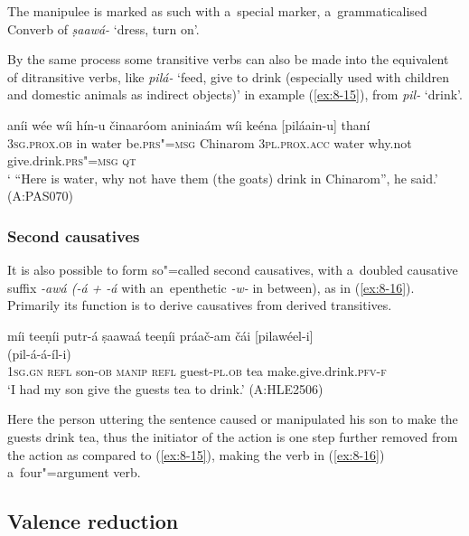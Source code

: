 The manipulee is marked as such with a~special marker, a~grammaticalised Converb of \textit{ṣaawá-} `dress, turn on'. 


By the same process some transitive verbs can also be made into the equivalent of ditransitive verbs, like \textit{pilá-} `feed, give to drink (especially used with children and domestic animals as indirect objects)' in example (\ref{ex:8-15}), from \textit{pil-} `drink'. 

\begin{exe}
\ex
\label{ex:8-15}
\gll aníi wée wíi hín-u činaaróom aniniaám wíi keéna [piláain-u] thaní  \\
\textsc{3sg.prox.ob} in water be.\textsc{prs"=msg} Chinarom \textsc{3pl.prox.acc} water why.not give.drink.\textsc{prs"=msg} \textsc{qt} \\
\glt ` ``Here is water, why not have them (the goats) drink in Chinarom'', he said.' (A:PAS070)
\end{exe}

\subsubsection*{Second causatives}

It is also possible to form so"=called second causatives, with a~doubled causative suffix \textit{-awá (-á + -á} with an~epenthetic \textit{-w-} in between), as in (\ref{ex:8-16}). Primarily its function is to derive causatives from derived transitives.

\begin{exe}
\ex
\label{ex:8-16}
\glll míi teeṇíi putr-á ṣaawaá teeṇíi práač-am čái
     [pilawéel-i]  \\
	{} {} {} {} {} {} {}  (pil-á-á-íl-i) \\
\textsc{1sg.gn} \textsc{refl} son-\textsc{ob} \textsc{manip} \textsc{refl} guest-\textsc{pl.ob} tea make.give.drink.\textsc{pfv-f} \\
\glt `I had my son give the guests tea to drink.' (A:HLE2506)
\end{exe}

Here the person uttering the sentence caused or manipulated his son to make the guests drink tea, thus the initiator of the action is one step further removed from the action as compared to (\ref{ex:8-15}), making the verb in (\ref{ex:8-16}) a~four"=argument verb. 


\subsection{Valence reduction}
\label{subsec:8-5-2}

